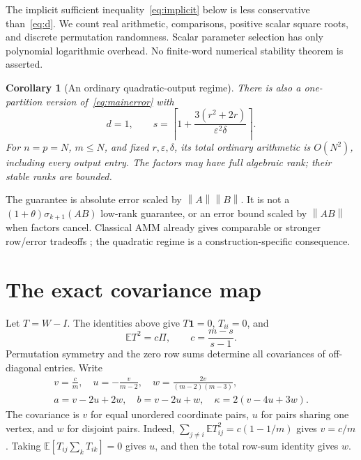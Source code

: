 \documentclass[11pt]{article}
\newtheorem{corollary}[theorem]{Corollary}
\newcommand{\E}{\mathbb E}
\newcommand{\norm}[1]{\left\lVert#1\right\rVert}
\begin{document}
The implicit sufficient inequality~\eqref{eq:implicit} below is less
conservative than~\eqref{eq:d}. We count real arithmetic, comparisons,
positive scalar square roots, and discrete permutation randomness.
Scalar parameter selection has only polynomial logarithmic overhead.
No finite-word numerical stability theorem is asserted.

\begin{corollary}[An ordinary quadratic-output regime]\label{cor:quadratic}
There is also a one-partition version of~\eqref{eq:mainerror} with
\begin{equation}\label{eq:singlechoice}
 d=1,\qquad
 s=\left\lceil1+\frac{3(r^2+2r)}{\varepsilon^2\delta}\right\rceil.
\end{equation}
For $n=p=N$, $m\le N$, and fixed $r,\varepsilon,\delta$, its total
ordinary arithmetic is $O(N^2)$, including every output entry.
The factors may have full algebraic rank; their stable ranks are bounded.
\end{corollary}

The guarantee is absolute error scaled by $\norm A\norm B$.
It is not a $(1+\theta)\sigma_{k+1}(AB)$ low-rank guarantee, or an
error bound scaled by $\norm{AB}$ when factors cancel.
Classical AMM already gives comparable or stronger row/error tradeoffs
\cite{CNW}; the quadratic regime is a construction-specific consequence.

\section{The exact covariance map}
Let $T=W-I$. The identities above give $T\mathbf1=0$, $T_{ii}=0$, and
\[
 \E T^2=c\Pi,\qquad c=\frac{m-s}{s-1}.
\]
Permutation symmetry and the zero row sums determine all covariances of
off-diagonal entries. Write
\begin{equation}\label{eq:coefficients}
 \begin{gathered}
 v=\frac cm,\quad u=-\frac v{m-2},\quad
 w=\frac{2v}{(m-2)(m-3)},\\
 a=v-2u+2w,\quad b=v-2u+w,\quad
 \kappa=2(v-4u+3w).
 \end{gathered}
\end{equation}
The covariance is $v$ for equal unordered coordinate pairs, $u$ for
pairs sharing one vertex, and $w$ for disjoint pairs. Indeed,
$\sum_{j\ne i}\E T_{ij}^2=c(1-1/m)$ gives $v=c/m$.
Taking $\E[T_{ij}\sum_k T_{ik}]=0$ gives $u$, and then the total
row-sum identity gives $w$.
\end{document}
